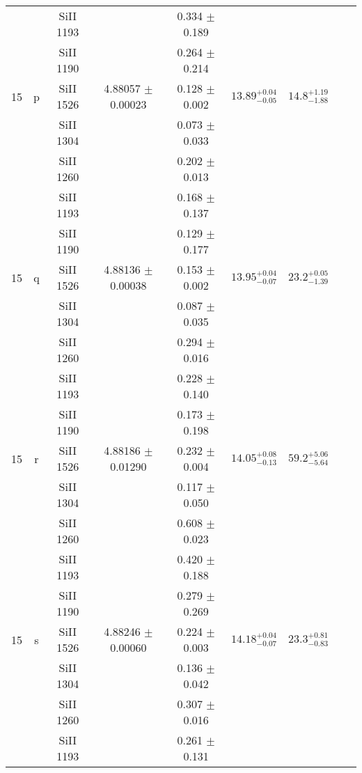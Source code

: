 \documentclass[12pt]{article}
\begin{document}
\begin{footnotesize}
\begin{longtable}{ c c c c c c c c c}
  &   & SiII     1193  &  &  0.334 $\pm$ 0.189   &   &     & 	 & \\ 
  &   & SiII     1190  &  &  0.264 $\pm$ 0.214   &   &     & 	 & \\ 
      15  & p  & SiII     1526  &  4.88057 $\pm$ 0.00023  &  0.128 $\pm$ 0.002   & $13.89_{ - 0.05}^{ + 0.04}$  & $14.8_{ - 1.88}^{ + 1.19}$    & 	 & \\ 
  &   & SiII     1304  &  &  0.073 $\pm$ 0.033   &   &     & 	 & \\ 
  &   & SiII     1260  &  &  0.202 $\pm$ 0.013   &   &     & 	 & \\ 
  &   & SiII     1193  &  &  0.168 $\pm$ 0.137   &   &     & 	 & \\ 
  &   & SiII     1190  &  &  0.129 $\pm$ 0.177   &   &     & 	 & \\ 
      15  & q  & SiII     1526  &  4.88136 $\pm$ 0.00038  &  0.153 $\pm$ 0.002   & $13.95_{ - 0.07}^{ + 0.04}$  & $23.2_{ - 1.39}^{ + 0.05}$    & 	 & \\ 
  &   & SiII     1304  &  &  0.087 $\pm$ 0.035   &   &     & 	 & \\ 
  &   & SiII     1260  &  &  0.294 $\pm$ 0.016   &   &     & 	 & \\ 
  &   & SiII     1193  &  &  0.228 $\pm$ 0.140   &   &     & 	 & \\ 
  &   & SiII     1190  &  &  0.173 $\pm$ 0.198   &   &     & 	 & \\ 
      15  & r  & SiII     1526  &  4.88186 $\pm$ 0.01290  &  0.232 $\pm$ 0.004   & $14.05_{ - 0.13}^{ + 0.08}$  & $59.2_{ - 5.64}^{ + 5.06}$    & 	 & \\ 
  &   & SiII     1304  &  &  0.117 $\pm$ 0.050   &   &     & 	 & \\ 
  &   & SiII     1260  &  &  0.608 $\pm$ 0.023   &   &     & 	 & \\ 
  &   & SiII     1193  &  &  0.420 $\pm$ 0.188   &   &     & 	 & \\ 
  &   & SiII     1190  &  &  0.279 $\pm$ 0.269   &   &     & 	 & \\ 
      15  & s  & SiII     1526  &  4.88246 $\pm$ 0.00060  &  0.224 $\pm$ 0.003   & $14.18_{ - 0.07}^{ + 0.04}$  & $23.3_{ - 0.83}^{ + 0.81}$    & 	 & \\ 
  &   & SiII     1304  &  &  0.136 $\pm$ 0.042   &   &     & 	 & \\ 
  &   & SiII     1260  &  &  0.307 $\pm$ 0.016   &   &     & 	 & \\ 
  &   & SiII     1193  &  &  0.261 $\pm$ 0.131   &   &     & 	 & \\ 

\end{longtable}
\end{footnotesize}
\end{document}
